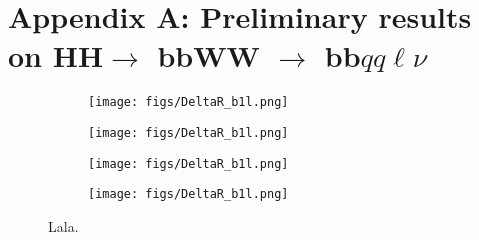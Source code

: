\documentclass[10pt,a4paper]{article}
\newcommand{\ww}{7.5cm} %
\newcommand{\hh}{5mm} %
\newcommand{\dd}{-2mm} %
\newcommand{\semi}{$\rightarrow$ bbWW $\rightarrow$ bb$qq\ell\nu$}
\begin{document}
\section*{Appendix A: Preliminary results on HH\semi}

\begin{figure*}[p]
	
  \begin{subfigure}[b]{17cm}
    \begin{minipage}[h!]{\ww}
      \centering
      \texttt{[image: figs/DeltaR\_b1l.png]}
    \end{minipage}
    \begin{minipage}[h!]{\ww}
      \centering
      \texttt{[image: figs/DeltaR\_b1l.png]}
    \end{minipage}
  \end{subfigure}
  \vspace{\hh}

  \begin{subfigure}[b]{17cm}
    \begin{minipage}[h!]{\ww}
      \centering
      \texttt{[image: figs/DeltaR\_b1l.png]}
    \end{minipage}
    \begin{minipage}[h!]{\ww}
      \centering
      \texttt{[image: figs/DeltaR\_b1l.png]}
    \end{minipage}
    \hspace{9mm}
  \end{subfigure}	
  \vspace{\dd}
  \caption{Lala.} \label{lala}
	
	\vspace{\hh}

\end{figure*}




%
\end{document}
